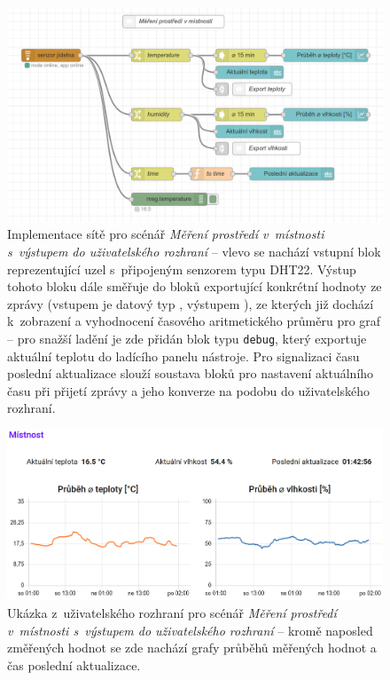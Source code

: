 \begin{figure}
    \centering
    \includegraphics[width=\textwidth]{figures/fis-flow-1.png}
    \caption{Implementace sítě pro scénář  \textit{Měření prostředí v~místnosti s~výstupem do uživatelského
    rozhraní} -- vlevo se nachází vstupní blok reprezentující uzel s~připojeným senzorem typu DHT22.
    Výstup tohoto bloku dále směřuje do bloků exportující konkrétní hodnoty ze zprávy (vstupem je datový typ
    , výstupem ), ze kterých již dochází k~zobrazení a vyhodnocení časového aritmetického
    průměru pro graf -- pro snažší ladění je zde přidán blok typu \texttt{debug}, který exportuje aktuální teplotu
    do ladícího panelu nástroje.
    Pro signalizaci času poslední aktualizace slouží soustava bloků pro nastavení aktuálního času při přijetí zprávy
    a jeho konverze na podobu do uživatelského rozhraní.}
    \label{fig:node-red-production-1}
\end{figure}
\begin{figure}
    \centering
    \includegraphics[width=\textwidth]{figures/fis-flow-1-ui.png}
    \caption{Ukázka z~uživatelského rozhraní pro scénář \textit{Měření prostředí v~místnosti s~výstupem do
    uživatelského rozhraní} -- kromě naposled změřených hodnot se zde nachází grafy průběhů měřených hodnot a čas
    poslední aktualizace.}
    \label{fig:node-red-production-1-ui}
\end{figure}

